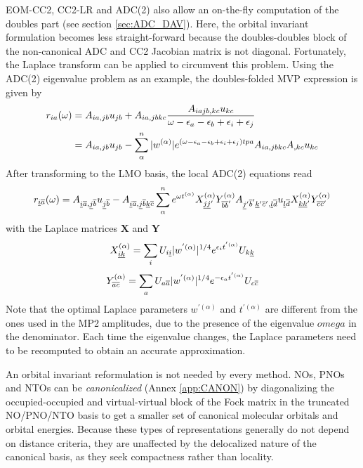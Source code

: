 EOM-CC2, CC2-LR and ADC(2) also allow an on-the-fly computation of the doubles part (see section \ref{sec:ADC_DAV}). Here, the orbital invariant formulation becomes less straight-forward because the doubles-doubles block of the non-canonical ADC and CC2 Jacobian matrix is not diagonal. Fortunately, the Laplace transform can be applied to circumvent this problem. Using the ADC(2) eigenvalue problem as an example, the doubles-folded MVP expression is given by
\begin{equation}
\begin{split}
r_{ia}(\omega) &= A_{ia,jb} u_{jb} + A_{ia,jbkc} \frac{A_{iajb,kc} u_{kc}}{\omega - \epsilon_a - \epsilon_b + \epsilon_i + \epsilon_j} \\
&= A_{ia,jb} u_{jb} - \sum_{\alpha}^{n} |w^{(\alpha)}| e^{\left(\omega - \epsilon_a - \epsilon_b + \epsilon_i + \epsilon_j\right) tpa} A_{ia,jbkc} A_{,kc} u_{kc} 
\end{split}
\end{equation}
After transforming to the LMO basis, the local ADC(2) equations read
\begin{equation}
r_{\underline{i} \overline{a}}(\omega) = A_{\underline{i} \overline{a}, \underline{j} \overline{b}} u_{\underline{j} \overline{b}} - A_{\underline{i} \overline{a}, \underline{j} \overline{b} \underline{k} \overline{c}} \sum_{\alpha}^{n} e^{\omega t^{(\alpha)}} X_{\underline{j} \underline{j}'}^{(\alpha)} Y_{\overline{b} \overline{b}'}^{(\alpha)} A_{\underline{j}' \overline{b}' \underline{k}' \overline{c}', \underline{l} \overline{d}} u_{\underline{l} \overline{d}} X_{\underline{k} \underline{k}'}^{(\alpha)} Y_{\overline{c} \overline{c}'}^{(\alpha)}  \\
\end{equation}
\noindent with the Laplace matrices $\mathbf{X}$ and $\mathbf{Y}$ 
\begin{equation}
X_{\underline{i}\underline{k}}^{(\alpha)} = \sum_i U_{i\underline{i}} |w^{'(\alpha)}|^{1/4} e^{\epsilon_i t^{'(\alpha)}} U_{k\underline{k}}
\end{equation}
\begin{equation}
Y_{\overline{a}\overline{c}}^{(\alpha)} = \sum_a U_{a\overline{a}} |w^{'(\alpha)}|^{1/4} e^{-\epsilon_a t^{'(\alpha)}} U_{c\overline{c}}
\end{equation}
\noindent Note that the optimal Laplace parameters $w^{'(\alpha)}$ and $t^{'(\alpha)}$ are different from the ones used in the MP2 amplitudes, due to the presence of the eigenvalue $omega$ in the denominator. Each time the eigenvalue changes, the Laplace parameters need to be recomputed to obtain an accurate approximation. 

An orbital invariant reformulation is not needed by every method. NOs, PNOs and NTOs can be \emph{canonicalized} (Annex \ref{app:CANON}) by diagonalizing the occupied-occupied and virtual-virtual block of the Fock matrix in the truncated NO/PNO/NTO basis to get a smaller set of canonical molecular orbitals and orbital energies. Because these types of representations generally do not depend on distance criteria, they are unaffected by the delocalized nature of the canonical basis, as they seek compactness rather than locality. 

